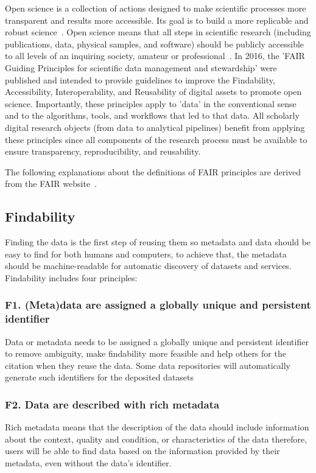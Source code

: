 Open science is a collection of actions designed to make scientific processes more transparent and results more accessible. Its goal is to build a more replicable and robust science~\cite{spellman_gilbert_corker_2017}. Open science means that all steps in scientific research (including publications, data, physical samples, and software) should be publicly accessible to all levels of an inquiring society, amateur or professional~\cite{woelfle2011open}. In 2016, the 'FAIR Guiding Principles for scientific data management and stewardship' were published and intended to provide guidelines to improve the Findability, Accessibility, Interoperability, and Reusability of digital assets to promote open science. Importantly, these principles apply to 'data' in the conventional sense and to the algorithms, tools, and workﬂows that led to that data. All scholarly digital research objects (from data to analytical pipelines) beneﬁt from applying these principles since all components of the research process must be available to ensure transparency, reproducibility, and reusability.

The following explanations about the definitions of FAIR principles are derived from the FAIR website~\cite{FAIR_Principles}.  
\subsection*{Findability}
Finding the data is the first step of reusing them so metadata and data should be easy to find for both humans and computers, to achieve that, the metadata should be machine-readable for automatic discovery of datasets and services.
Findability includes four principles:
\subsubsection*{F1. (Meta)data are assigned a globally unique and persistent identifier}
Data or metadata needs to be assigned a globally unique and persistent identifier to remove ambiguity, make findability more feasible and help others for the citation when they reuse the data. Some data repositories will automatically generate such identifiers for the deposited datasets

\subsubsection*{F2. Data are described with rich metadata}
Rich metadata means that the description of the data should include information about the context, quality and condition, or characteristics of the data therefore, users will be able to find data based on the information provided by their metadata, even without the data's identifier.

